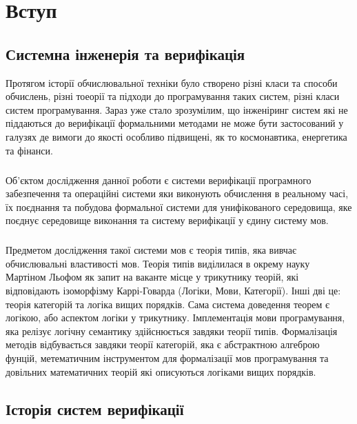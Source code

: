 \documentclass[9pt]{memoir}
\begin{document}
\titleINF

\chapter{Вступ}

\section{Системна інженерія та верифікація}

    Протягом історії обчислювальної техніки було створено різні класи та способи обчислень,
    різні тоеорії та підходи до програмування таких систем, різні класи систем програмування.
    Зараз уже стало зрозумілим, що інженіринг систем які не піддаються до верифікації
    формальними методами не може бути застосований у галузях де вимоги до якості
    особливо підвищені, як то космонавтика, енергетика та фінанси.

    \paragraph{}
    Об'єктом дослідження данної роботи є системи верифікації програмного забезпечення
    та операційні системи яки виконують обчислення в реальному часі, їх поєднання
    та побудова формальної системи для унифікованого середовища, яке поєднує
    середовище виконання та систему верифікації у єдину систему мов.

    \paragraph{}
    Предметом дослідження такої системи мов є теорія типів, яка вивчає обчислювальні властивості мов.
    Теорія типів виділилася в окрему науку Мартіном Льофом як запит на ваканте місце у
    трикутнику теорій, які відповідають ізоморфізму Каррі-Говарда (Логіки, Мови, Категорії).
    Інші дві це: теорія категорій та логіка вищих порядків. Сама система доведення теорем є
    логікою, або аспектом логіки у трикутнику. Імплементація мови програмування,
    яка релізує логічну семантику здійснюється завдяки теорії типів. Формалізація методів
    відбувається завдяки теорії категорій, яка є абстрактною алгеброю фунцій,
    метематичним інструментом для формалізації мов програмування та довільних
    математичних теорій які описуються логіками вищих порядків.

\newpage
\section{Історія систем верифікації}
\end{document}
